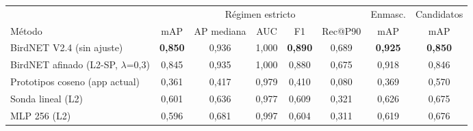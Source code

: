 \begin{tabular}{lccccccc}
\toprule
 & \multicolumn{5}{c}{Régimen estricto} & Enmasc. & Candidatos\\
\cmidrule(lr){2-6}\cmidrule(lr){7-7}\cmidrule(lr){8-8}
Método & mAP & AP mediana & AUC & F1 & Rec@P90 & mAP & mAP\\
\midrule
BirdNET V2.4 (sin ajuste) & \textbf{0{,}850} & 0{,}936 & 1{,}000 & \textbf{0{,}890} & 0{,}689 & \textbf{0{,}925} & \textbf{0{,}850}\\
\midrule
BirdNET afinado (L2-SP, $\lambda$=0,3) & 0{,}845 & 0{,}935 & 1{,}000 & 0{,}880 & 0{,}675 & 0{,}918 & 0{,}846\\
\midrule
Prototipos coseno (app actual) & 0{,}361 & 0{,}417 & 0{,}979 & 0{,}410 & 0{,}080 & 0{,}369 & 0{,}570\\
Sonda lineal (L2) & 0{,}601 & 0{,}636 & 0{,}977 & 0{,}609 & 0{,}321 & 0{,}626 & 0{,}675\\
MLP 256 (L2) & 0{,}596 & 0{,}681 & 0{,}997 & 0{,}604 & 0{,}311 & 0{,}619 & 0{,}676\\
\bottomrule
\end{tabular}
